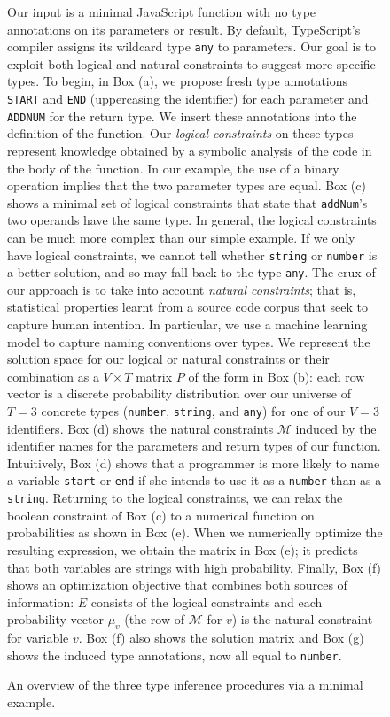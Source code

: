 \documentclass[sigplan,10pt,review,anonymous]{acmart} %
\theoremstyle{plain}
\theoremstyle{remark}
\theoremstyle{definition}
\begin{document}
\begin{figure*}
\vspace{1em}
\begin{minipage}{\textwidth}
Our input is a minimal JavaScript function
with no type annotations on its parameters or result.
%
By default, TypeScript's compiler assigns its wildcard type \lstinline+any+ to
parameters.
%
Our goal is to exploit both logical and natural constraints to suggest
more specific types.
%
To begin, in Box (a), we propose fresh type annotations  \lstinline{START} and \lstinline{END} (uppercasing the identifier) for each parameter and \lstinline{ADDNUM} for the return type.
%
We insert these annotations into the definition of the function.
%
Our \emph{logical constraints} on these types represent knowledge obtained
by a symbolic analysis of the code in the body of the function.
%
In our example, the use of a binary operation implies that the two parameter types are equal.
%
Box (c) shows a minimal set of logical constraints that state
that \lstinline+addNum+'s two operands have the same type.
%
In general, the logical constraints can be much more complex than our simple example.
%
If we only have logical constraints, we cannot tell
whether \lstinline{string} or \lstinline{number} is a better solution,
and so may fall back to the type \lstinline{any}.
%
The crux of our approach is to take into account \emph{natural constraints};
that is, statistical properties learnt from a source code corpus that seek to
capture human intention.
%
In particular, we use a machine learning model to capture naming conventions over types.
%
We represent the solution space for our logical or natural constraints or their combination
as a $V \times T$ matrix $P$ of the form in Box (b):
each row vector is a discrete probability distribution
over our universe of $T=3$ concrete types
(\lstinline{number}, \lstinline{string}, and \lstinline{any}) for one of our $V=3$ identifiers.
%
Box (d) shows the natural constraints $\mathcal{M}$ induced by the identifier names
for the parameters and return types of our function.
%
Intuitively, Box (d) shows that a programmer
is more likely to name a variable \lstinline{start} or \lstinline{end}
if she intends to use it as a \lstinline{number} than as a \lstinline{string}.
%
%
Returning to the logical constraints,
we can relax the boolean constraint of Box (c) to a numerical function on probabilities
as shown in Box (e).
%
When we numerically optimize the resulting expression, we obtain the matrix in Box (e);
it predicts that both variables are strings with high probability.
%
Finally, Box (f) shows an optimization objective that
combines both sources of information:
$E$ consists of the logical constraints
and each probability vector $\mu_v$ (the row of $\mathcal{M}$ for $v$)
is the natural constraint for variable $v$.
%
Box (f) also shows the solution matrix and Box (g) shows the induced type annotations,
now all equal to \lstinline{number}.
\end{minipage}
\caption{An overview of the three type inference procedures via a minimal example.}\label{fig:fullexample}
\end{figure*}
\end{document}
